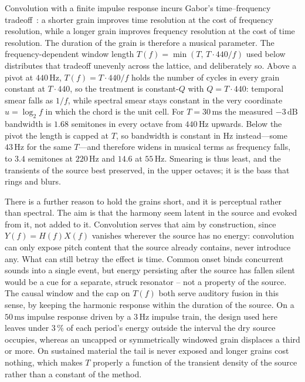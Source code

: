 \documentclass[runningheads,a4paper]{llncs}
\begin{document}
Convolution with a finite impulse response incurs Gabor's time--frequency
tradeoff~\cite{gabor1946theory}: a shorter grain improves time resolution at
the cost of frequency resolution, while a longer grain improves frequency resolution 
at the cost of time resolution. 
The duration of the grain is therefore a musical parameter. The
frequency-dependent window length $T(f)=\min(T,\,T\cdot 440/f)$ used below
distributes that tradeoff unevenly across the lattice, and deliberately so.
Above a pivot at $440\,\mathrm{Hz}$, $T(f)=T\cdot 440/f$ holds the number of
cycles in every grain constant at $T\cdot 440$, so the treatment is
constant-$Q$ with $Q=T\cdot 440$: temporal smear falls as $1/f$, while spectral
smear stays constant in the very coordinate $u=\log_2 f$ in which the chord is
the unit cell. For $T=30\,\mathrm{ms}$ the measured $-3\,\mathrm{dB}$ bandwidth
is $1.68$ semitones in every octave from $440\,\mathrm{Hz}$ upwards. Below the
pivot the length is capped at $T$, so bandwidth is constant in Hz instead---some
$43\,\mathrm{Hz}$ for the same $T$---and therefore widens in musical terms as
frequency falls, to $3.4$ semitones at $220\,\mathrm{Hz}$ and $14.6$ at
$55\,\mathrm{Hz}$. Smearing is thus least, and the transients of the source best
preserved, in the upper octaves; it is the bass that rings and blurs.

There is a further reason to hold the grains short, and it is perceptual rather
than spectral. The aim is that the harmony seem latent in the source and evoked from
it, not added to it. Convolution serves that aim by construction,
since $Y(f)=H(f)X(f)$ vanishes wherever the source has no energy: convolution 
can only expose pitch content that the source already contains, never introduce any.
What can still betray the effect is time. Common onset binds concurrent sounds
into a single event, but energy persisting after the source has fallen silent
would be a cue for a separate, struck resonator -- not a property of the
source. The causal window and the cap on $T(f)$ both serve auditory fusion in
this sense, by keeping the harmonic response within the duration of the source.
On a $50\,\mathrm{ms}$ impulse response driven by a $3\,\mathrm{Hz}$ impulse
train, the design used here leaves under $3\,\%$ of each period's energy
outside the interval the dry source occupies, whereas an uncapped or
symmetrically windowed grain displaces a third or more. On sustained material 
the tail is never exposed and longer grains
cost nothing, which makes $T$ properly a function of the transient density of
the source rather than a constant of the method.
\end{document}
